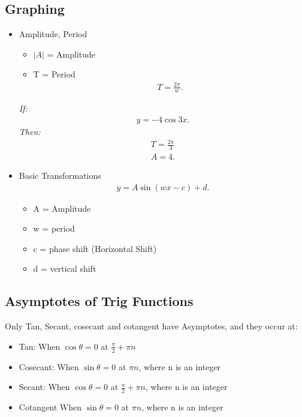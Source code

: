 \documentclass{report}
\begin{document}
      \subsection{Graphing}
      \begin{itemize}
        \item Amplitude, Period
          \begin{itemize}
            \item $|A|$ = Amplitude
            \item T = Period
              \begin{align*}
                T = \frac{2\pi}{w}
              .\end{align*}
          \end{itemize}
          \bigbreak \noindent 
          \textit{If:}
          \begin{align*}
            y = -4\cos{3x}
          .\end{align*}
          \bigbreak \noindent 
          \textit{Then:}
          \begin{align*}
            T=\frac{2\pi}{3} \\
            A = 4
          .\end{align*}
        \item Basic Transformations
          \begin{align*}
            y = A\sin{(wx-c)} + d            
          .\end{align*}
          \begin{itemize}
            \item A = Amplitude
            \item w = period 
            \item c = phase shift (Horizontal Shift)
            \item d = vertical shift
          \end{itemize}
      \end{itemize}

      \bigbreak \noindent \bigbreak \noindent 
      \subsection{Asymptotes of Trig Functions}
      \bigbreak \noindent 
      Only Tan, Secant, cosecant and cotangent have Asymptotes, and they occur at:
      \begin{itemize}
        \item Tan: When $\cos{\theta } = 0$ at $\frac{\pi}{2} + \pi n$
        \item Cosecant: When $\sin{\theta } = 0$ at $\pi n$, where n is an integer
        \item Secant: When $\cos{\theta} = 0$ at $\frac{\pi}{2} + \pi n$, where n is an integer
        \item Cotangent When $\sin{\theta } = 0$ at $\pi n$, where n is an integer
      \end{itemize}
\end{document}
